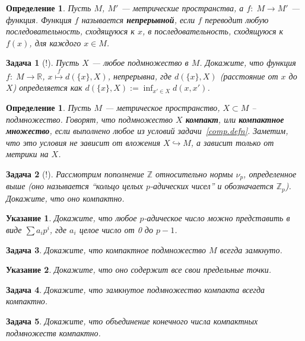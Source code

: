 \documentclass[12pt]{book}
\def\Z{{\mathbb Z}}
\def\R{{\mathbb R}}
\theoremstyle{upshape}
\newtheorem{zadacha}{Задача}[chapter]
\theoremstyle{generic}
\newtheorem{opredelenie}[teorema]{Определение}
\theoremstyle{upshapenonumber}
\newtheorem{ukazanie}{Указание}[section]
\newcommand{\следствие}{%
     \refstepcounter{teorema}
     {\noindent\bf Следствие \thechapter.\arabic{teorema}:\ }}
\newcommand{\пример}{%
     \refstepcounter{teorema}
     {\noindent\bf Пример \thechapter.\arabic{teorema}:\ }}
\newcommand{\лемма}{%
     \refstepcounter{teorema}
     {\noindent\bf Лемма \thechapter.\arabic{teorema}:\ }}
\newcommand{\теорема}{%
     \refstepcounter{teorema}
     {\noindent\bf Теорема \thechapter.\arabic{teorema}:\ }}
\newcommand{\утверждение}{%
     \refstepcounter{teorema}
     {\noindent\bf Утверждение \thechapter.\arabic{teorema}:\ }}
\begin{document}
{\begin{opredelenie} Пусть $M$, $M'$ --- метрические пространства,
а $f:\; M \to M'$ --- функция. Функция $f$ называется {\bf
непрерывной}, если $f$ переводит любую последовательность,
сходящуюся к $x$, в последовательность, сходящуюся к $f(x)$,
для каждого $x\in M$.
\end{opredelenie}

\begin{zadacha}[!] Пусть $X$ --- любое подмножество в $M$.
Докажите, что функция $f:\; M \to \R$, $x \overset f \mapsto
d(\{x\}, X)$, непрерывна, где $d(\{x\}, X)$ (расстояние
от $x$ до $X$) определяется как
$d(\{x\}, X):=\inf_{x'\in X}d(x, x')$.
\end{zadacha}

\begin{opredelenie} Пусть $M$ --- метрическое пространство, $X\subset M$
-- подмножество. Говорят, что подмножество $X$ {\bf компакт}, или
{\bf компактное множество}, если выполнено любое из условий
задачи~\ref{comp.defn}. Заметим, что это условия не зависит
от вложения $X\hookrightarrow M$, а зависит только от метрики 
на $X$.
\end{opredelenie}

\begin{zadacha}[!] Рассмотрим пополнение $\Z$ относительно
нормы $\nu_p$, определенное выше (оно называется ``кольцо целых
$p$-адических чисел'' и обозначается $\Z_p$). Докажите, что оно
компактно.
\end{zadacha}

\begin{ukazanie} Докажите, что любое $p$-адическое число
можно представить в виде $\sum a_i p^i$, где $a_i$ целое число от 0
до $p-1$.
\end{ukazanie}

\begin{zadacha} Докажите, что компактное 
подмножество $M$ всегда замкнуто.
\end{zadacha}

\begin{ukazanie} Докажите, что оно содержит все свои предельные
точки.
\end{ukazanie}

\begin{zadacha} Докажите, что замкнутое подмножество компакта всегда
компактно.
\end{zadacha}

\begin{zadacha} Докажите, что объединение конечного числа компактных
подмножеств компактно.
\end{zadacha}

}
\end{document}
